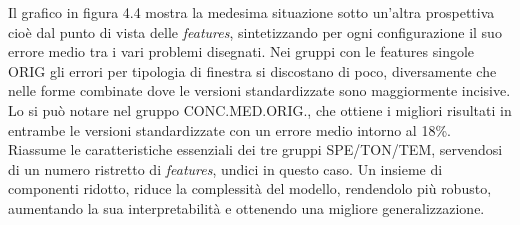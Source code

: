Il grafico in figura 4.4 mostra la medesima situazione sotto un'altra prospettiva cioè dal punto di vista
delle \textit{features}, sintetizzando per ogni configurazione il suo errore medio tra i vari problemi
disegnati. Nei gruppi con le features singole ORIG gli errori per tipologia di finestra si
discostano di poco, diversamente che nelle forme combinate dove le versioni standardizzate
sono maggiormente incisive. Lo si può notare nel gruppo CONC.MED.ORIG., che ottiene i
migliori risultati in entrambe le versioni standardizzate con un errore medio intorno al 18\%.
Riassume le caratteristiche essenziali dei tre gruppi SPE/TON/TEM, servendosi di un numero
ristretto di \textit{features}, undici in questo caso. Un insieme di componenti ridotto, riduce la
complessità del modello, rendendolo più robusto, aumentando la sua interpretabilità e
ottenendo una migliore generalizzazione.

